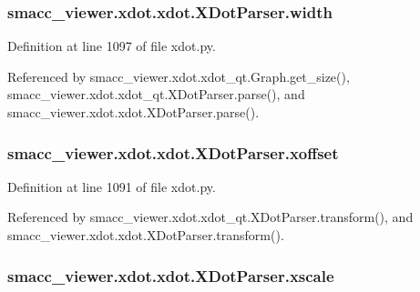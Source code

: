 \subsubsection[{\texorpdfstring{width}{width}}]{\setlength{\rightskip}{0pt plus 5cm}smacc\+\_\+viewer.\+xdot.\+xdot.\+X\+Dot\+Parser.\+width}\hypertarget{classsmacc__viewer_1_1xdot_1_1xdot_1_1XDotParser_a2fd09ff25776c1dcbb3b23fe1679a312}{}\label{classsmacc__viewer_1_1xdot_1_1xdot_1_1XDotParser_a2fd09ff25776c1dcbb3b23fe1679a312}


Definition at line 1097 of file xdot.\+py.



Referenced by smacc\+\_\+viewer.\+xdot.\+xdot\+\_\+qt.\+Graph.\+get\+\_\+size(), smacc\+\_\+viewer.\+xdot.\+xdot\+\_\+qt.\+X\+Dot\+Parser.\+parse(), and smacc\+\_\+viewer.\+xdot.\+xdot.\+X\+Dot\+Parser.\+parse().

\subsubsection[{\texorpdfstring{xoffset}{xoffset}}]{\setlength{\rightskip}{0pt plus 5cm}smacc\+\_\+viewer.\+xdot.\+xdot.\+X\+Dot\+Parser.\+xoffset}\hypertarget{classsmacc__viewer_1_1xdot_1_1xdot_1_1XDotParser_a62eaf1edc60a3fc0fa9de0ea6e4e48ae}{}\label{classsmacc__viewer_1_1xdot_1_1xdot_1_1XDotParser_a62eaf1edc60a3fc0fa9de0ea6e4e48ae}


Definition at line 1091 of file xdot.\+py.



Referenced by smacc\+\_\+viewer.\+xdot.\+xdot\+\_\+qt.\+X\+Dot\+Parser.\+transform(), and smacc\+\_\+viewer.\+xdot.\+xdot.\+X\+Dot\+Parser.\+transform().

\subsubsection[{\texorpdfstring{xscale}{xscale}}]{\setlength{\rightskip}{0pt plus 5cm}smacc\+\_\+viewer.\+xdot.\+xdot.\+X\+Dot\+Parser.\+xscale}\hypertarget{classsmacc__viewer_1_1xdot_1_1xdot_1_1XDotParser_a3c3b5417bb8d937745bc0160d568915f}{}\label{classsmacc__viewer_1_1xdot_1_1xdot_1_1XDotParser_a3c3b5417bb8d937745bc0160d568915f}



